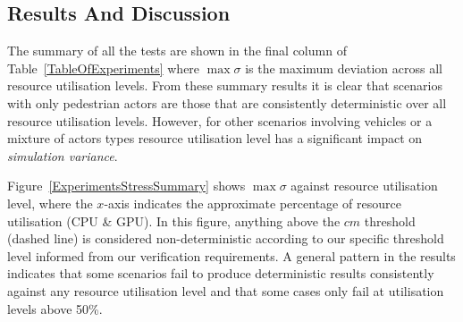 \documentclass[letterpaper, 10 pt, journal, twoside]{IEEEtran}
\begin{document}



\subsection{Results And Discussion}\label{ResultsSection}
The summary of all the tests are shown in the final column of Table~\ref{TableOfExperiments} where $\max\sigma$ is the maximum deviation across all resource utilisation levels. From these summary results it is clear that scenarios with only pedestrian actors are those that are consistently deterministic over all resource utilisation levels. However, for other scenarios involving vehicles or a mixture of actors types resource utilisation level has a significant impact on \textit{simulation variance}.

Figure~\ref{ExperimentsStressSummary} shows $\max\sigma$ against resource utilisation level, where the $x$-axis indicates the approximate percentage of resource utilisation (CPU \& GPU). In this figure, anything above the $cm$ threshold (dashed line) is considered non-deterministic according to our specific threshold level informed from our verification requirements. A general pattern in the results indicates that some scenarios fail to produce deterministic results consistently against any resource utilisation level and that some cases only fail at utilisation levels above 50\%.
\end{document}
